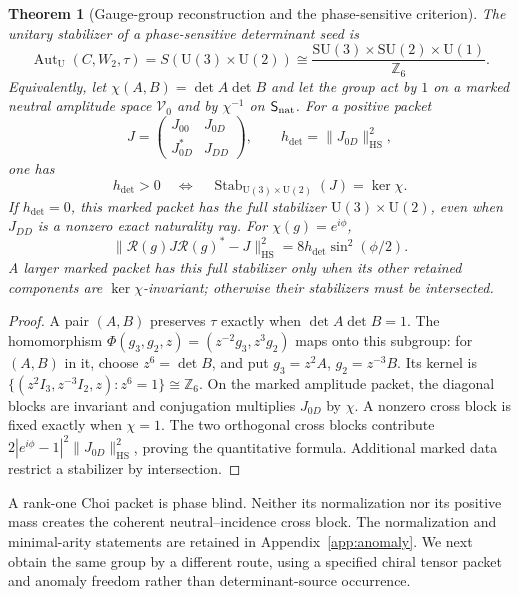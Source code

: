 \documentclass[11pt]{article}
\numberwithin{equation}{section}
\newtheorem{theorem}{Theorem}[section]
\theoremstyle{definition}
\theoremstyle{remark}
\newcommand{\Z}{\mathbb Z}
\newcommand{\Aut}{\operatorname{Aut}}
\newcommand{\U}{\mathrm U}
\newcommand{\SU}{\mathrm{SU}}
\newcommand{\HS}{\mathrm{HS}}
\begin{document}
\begin{theorem}[Gauge-group reconstruction and the phase-sensitive criterion]
\label{thm:gauge-group}
The unitary stabilizer of a phase-sensitive determinant seed is
\begin{equation}
 \Aut_{\U}(C,W_2,\tau)=S(\U(3)\times\U(2))
 \cong\frac{\SU(3)\times\SU(2)\times\U(1)}{\Z_6}.
 \label{eq:SM-gauge-group}
\end{equation}
Equivalently, let $\chi(A,B)=\det A\det B$ and let the group act by $1$ on
a marked neutral amplitude space $\mathscr V_0$ and by $\chi^{-1}$ on
$\mathsf S_{\rm nat}$.  For a positive packet
\[
 J=\begin{pmatrix}J_{00}&J_{0D}\\J_{0D}^*&J_{DD}\end{pmatrix},\qquad
 h_{\det}=\|J_{0D}\|_{\HS}^2,
\]
one has
\begin{equation}
 h_{\det}>0\quad\Longleftrightarrow\quad
 \operatorname{Stab}_{\U(3)\times\U(2)}(J)=\ker\chi.
 \label{eq:operational-determinant-group}
\end{equation}
If $h_{\det}=0$, this marked packet has the full stabilizer
$\U(3)\times\U(2)$, even when $J_{DD}$ is a nonzero exact naturality ray.
For $\chi(g)=e^{i\phi}$,
\begin{equation}
 \|\mathcal R(g)J\mathcal R(g)^*-J\|_{\HS}^2
       =8h_{\det}\sin^2(\phi/2).
 \label{eq:determinant-phase-rigidity}
\end{equation}
A larger marked packet has this full stabilizer only when its other retained
components are $\ker\chi$-invariant; otherwise their stabilizers must be
intersected.
\end{theorem}
\begin{proof}
A pair $(A,B)$ preserves $\tau$ exactly when $\det A\det B=1$.
The homomorphism
$\Phi(g_3,g_2,z)=(z^{-2}g_3,z^3g_2)$ maps onto this subgroup: for $(A,B)$
in it, choose $z^6=\det B$, and put $g_3=z^2A$, $g_2=z^{-3}B$.
Its kernel is
$\{(z^2I_3,z^{-3}I_2,z):z^6=1\}\cong\Z_6$.
On the marked amplitude packet, the diagonal blocks are invariant and
conjugation multiplies $J_{0D}$ by $\chi$.  A nonzero cross block is fixed
exactly when $\chi=1$.  The two orthogonal cross blocks contribute
$2|e^{i\phi}-1|^2\|J_{0D}\|_{\HS}^2$, proving the quantitative formula.
Additional marked data restrict a stabilizer by intersection.
\end{proof}

A rank-one Choi packet is phase blind.  Neither its normalization nor its
positive mass creates the coherent neutral--incidence cross block.
The normalization and minimal-arity statements are retained in
Appendix~\ref{app:anomaly}.  We next obtain the same group by a different
route, using a specified chiral tensor packet and anomaly freedom rather
than determinant-source occurrence.
\end{document}
